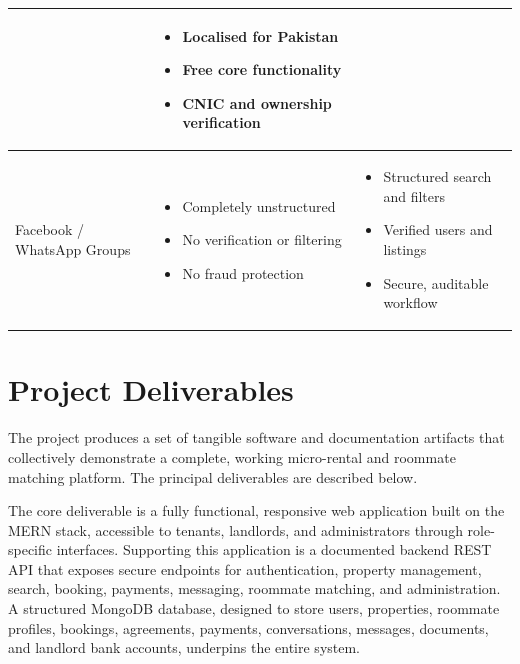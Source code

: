 \begin{table}[h!]
\begin{tabularx}{\textwidth}{|>{\raggedright\arraybackslash}p{3cm}|X|X|}
&
\begin{itemize}[leftmargin=*, noitemsep, topsep=0pt]
    \item Localised for Pakistan
    \item Free core functionality
    \item CNIC and ownership verification
\end{itemize}
\\
\hline
Facebook / WhatsApp Groups &
\begin{itemize}[leftmargin=*, noitemsep, topsep=0pt]
    \item Completely unstructured
    \item No verification or filtering
    \item No fraud protection
\end{itemize}
&
\begin{itemize}[leftmargin=*, noitemsep, topsep=0pt]
    \item Structured search and filters
    \item Verified users and listings
    \item Secure, auditable workflow
\end{itemize}
\\
\hline

\end{tabularx}
\end{table}


\section{Project Deliverables}

The project produces a set of tangible software and documentation artifacts that collectively demonstrate a complete, working micro-rental and roommate matching platform. The principal deliverables are described below.

The core deliverable is a fully functional, responsive web application built on the MERN stack, accessible to tenants, landlords, and administrators through role-specific interfaces. Supporting this application is a documented backend REST API that exposes secure endpoints for authentication, property management, search, booking, payments, messaging, roommate matching, and administration. A structured MongoDB database, designed to store users, properties, roommate profiles, bookings, agreements, payments, conversations, messages, documents, and landlord bank accounts, underpins the entire system.

